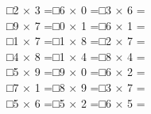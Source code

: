 \documentclass[uplatex,
paper=a4,
fontsize=18pt,
jafontsize=16pt,
number_of_lines=30,
line_length=30zh,
baselineskip=25pt,
]{jlreq}
\begin{document}
□\hspace{1em}2 × 3 =\hspace{3em}□\hspace{1em}6 × 0 =\hspace{3em}□\hspace{1em}3 × 6 =\hspace{3em}
\\

□\hspace{1em}9 × 7 =\hspace{3em}□\hspace{1em}0 × 1 =\hspace{3em}□\hspace{1em}6 × 1 =\hspace{3em}
\\

□\hspace{1em}1 × 7 =\hspace{3em}□\hspace{1em}1 × 8 =\hspace{3em}□\hspace{1em}2 × 7 =\hspace{3em}
\\

□\hspace{1em}4 × 8 =\hspace{3em}□\hspace{1em}1 × 4 =\hspace{3em}□\hspace{1em}8 × 4 =\hspace{3em}
\\

□\hspace{1em}5 × 9 =\hspace{3em}□\hspace{1em}9 × 0 =\hspace{3em}□\hspace{1em}6 × 2 =\hspace{3em}
\\

□\hspace{1em}7 × 1 =\hspace{3em}□\hspace{1em}8 × 9 =\hspace{3em}□\hspace{1em}3 × 7 =\hspace{3em}
\\

□\hspace{1em}5 × 6 =\hspace{3em}□\hspace{1em}5 × 2 =\hspace{3em}□\hspace{1em}6 × 5 =\hspace{3em}
\\
\end{document}
